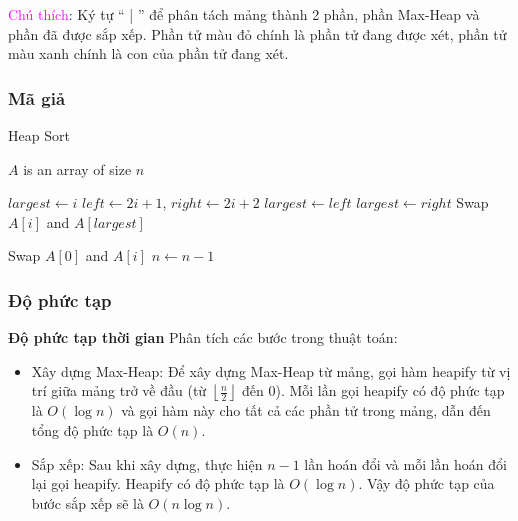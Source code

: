 \textcolor{magenta}{Chú thích}: Ký tự “ | ” để phân tách mảng thành 2 phần, phần Max-Heap và phần đã được sắp xếp. Phần tử màu đỏ chính là phần tử đang được xét, phần tử màu xanh chính là con của phần tử đang xét. 


\subsubsection{Mã giả}
 
\begin{algorithm}[H]
\caption{Heap Sort}
\label{alg:heap-sort}
\begin{algorithmic}

\Require $A$ is an array of size $n$

\State $largest \gets i$
\State $left \gets 2i + 1$, $right \gets 2i + 2$
    \State $largest \gets left$
\EndIf
{}
    \State $largest \gets right$
\EndIf
{}
    \State Swap $A[i]$ and $A[largest]$
\EndIf
\EndFunction \State

\EndFor
\EndFunction \State


\State {} 
    \State Swap $A[0]$ and $A[i]$ 
    \State $n \gets n - 1$ 
    \State {} 
\EndFor
\EndFunction


\end{algorithmic}
\end{algorithm}


\subsubsection{Độ phức tạp}
\textbf{Độ phức tạp thời gian} Phân tích các bước trong thuật toán:

\begin{itemize}
    \item Xây dựng Max-Heap: Để xây dựng Max-Heap từ mảng, gọi hàm heapify từ vị trí giữa mảng trở về đầu (từ $\left\lfloor \frac{n}{2} \right\rfloor$ đến 0). Mỗi lần gọi heapify có độ phức tạp là $O(\log{n})$ và gọi hàm này cho tất cả các phần tử trong mảng, dẫn đến tổng độ phức tạp là $O(n)$.
    \item Sắp xếp: Sau khi xây dựng, thực hiện $n-1$ lần hoán đổi và mỗi lần hoán đổi lại gọi heapify. Heapify có độ phức tạp là $O(\log{n})$. Vậy độ phức tạp của bước sắp xếp sẽ là $O(n\log{n})$.
\end{itemize}

